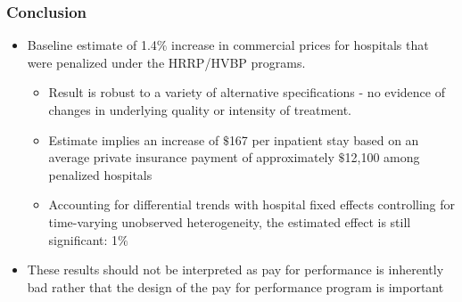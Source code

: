 \documentclass{beamer}
\begin{document}
\begin{frame}
\frametitle{Conclusion}
\begin{itemize}
\item 
Baseline estimate of 1.4$\%$ increase in commercial prices for hospitals that were penalized under the HRRP/HVBP programs.
\begin{itemize}
\item 
Result is robust to a variety of alternative speciﬁcations - no evidence of changes in underlying quality or intensity of treatment. 
\item 
Estimate implies an increase of $\$$167 per inpatient stay based on an average private insurance payment of approximately $\$$12,100 among penalized hospitals
\item
Accounting for differential trends with hospital ﬁxed eﬀects controlling for time-varying unobserved heterogeneity, the estimated effect is still signiﬁcant: 1$\%$ 
\end{itemize}
\item
These results should not be interpreted as pay for performance is inherently bad rather that the design of the pay for performance program is important 
\end{itemize}
\end{frame}
\end{document}
